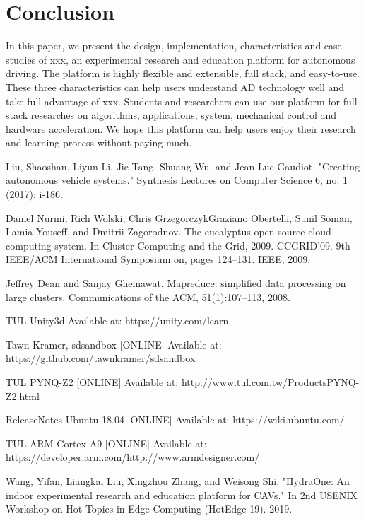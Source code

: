 \documentclass[conference]{IEEEtran}
\begin{document}
\begin{sloppypar}
\section{Conclusion}
In this paper, we present the design, implementation, characteristics and case studies of xxx, an experimental research and education platform for autonomous driving. The platform is highly flexible and extensible, full stack, and easy-to-use. These three characteristics can help users understand AD technology well and take full advantage of xxx. Students and researchers can use our platform for full-stack researches on algorithms, applications, system, mechanical control and hardware acceleration. We hope this platform can help users enjoy their research and learning process without paying much.


\begin{thebibliography}{00}

 Liu, Shaoshan, Liyun Li, Jie Tang, Shuang Wu, and Jean-Luc Gaudiot. "Creating autonomous vehicle systems." Synthesis Lectures on Computer Science 6, no. 1 (2017): i-186.

 Daniel Nurmi, Rich Wolski, Chris GrzegorczykGraziano Obertelli, Sunil Soman, Lamia Youseff, and Dmitrii Zagorodnov. The eucalyptus open-source cloud-computing system. In Cluster Computing and the Grid, 2009. CCGRID’09. 9th IEEE/ACM International Symposium on, pages 124–131. IEEE, 2009.

 Jeffrey Dean and Sanjay Ghemawat. Mapreduce: simplified data processing on large clusters. Communications
of the ACM, 51(1):107–113, 2008.

 TUL Unity3d Available at: https://unity.com/learn

 Tawn Kramer, sdsandbox [ONLINE] Available at: https://github.com/tawnkramer/sdsandbox

 TUL PYNQ-Z2 [ONLINE] Available at: http://www.tul.com.tw/ProductsPYNQ-Z2.html

 ReleaseNotes Ubuntu 18.04 [ONLINE] Available at: https://wiki.ubuntu.com/

 TUL ARM Cortex-A9 [ONLINE] Available at: https://developer.arm.com/http://www.armdesigner.com/

 Wang, Yifan, Liangkai Liu, Xingzhou Zhang, and Weisong Shi. "HydraOne: An indoor experimental research and education platform for CAVs." In 2nd {USENIX} Workshop on Hot Topics in Edge Computing (HotEdge 19). 2019.


\end{thebibliography}
\end{sloppypar}
\end{document}
